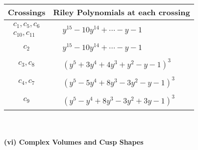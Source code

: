 \documentclass[1p]{elsarticle_modified}
\theoremstyle{definition}
\begin{document}
\begin{tabular}{m{50pt}|m{274pt}}
Crossings & \hspace{64pt}Riley Polynomials at each crossing \\
\hline $$\begin{aligned}c_{1},c_{5},c_{6}\\c_{10},c_{11}\end{aligned}$$&$\begin{aligned}
&y^{15}-10 y^{14}+\cdots- y-1
\end{aligned}$\\
\hline $$\begin{aligned}c_{2}\end{aligned}$$&$\begin{aligned}
&y^{15}-10 y^{14}+\cdots- y-1
\end{aligned}$\\
\hline $$\begin{aligned}c_{3},c_{8}\end{aligned}$$&$\begin{aligned}
&(y^5+3 y^4+4 y^3+y^2- y-1)^3
\end{aligned}$\\
\hline $$\begin{aligned}c_{4},c_{7}\end{aligned}$$&$\begin{aligned}
&(y^5-5 y^4+8 y^3-3 y^2- y-1)^3
\end{aligned}$\\
\hline $$\begin{aligned}c_{9}\end{aligned}$$&$\begin{aligned}
&(y^5- y^4+8 y^3-3 y^2+3 y-1)^3
\end{aligned}$\\
\hline
\end{tabular}\\~\\
\newpage\flushleft \textbf{(vi) Complex Volumes and Cusp Shapes}
\end{document}
